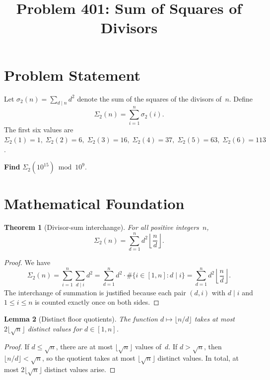 \documentclass[11pt]{article}
\title{Problem 401: Sum of Squares of Divisors}
\author{}
\date{}
\newtheorem{theorem}{Theorem}
\newtheorem{lemma}[theorem]{Lemma}
\begin{document}
\maketitle

\section{Problem Statement}

Let $\sigma_2(n) = \sum_{d \mid n} d^2$ denote the sum of the squares of the divisors of~$n$. Define
\[
  \Sigma_2(n) = \sum_{i=1}^{n} \sigma_2(i).
\]
The first six values are $\Sigma_2(1) = 1,\; \Sigma_2(2) = 6,\; \Sigma_2(3) = 16,\; \Sigma_2(4) = 37,\; \Sigma_2(5) = 63,\; \Sigma_2(6) = 113$.

\medskip\noindent
\textbf{Find} $\Sigma_2(10^{15}) \bmod 10^9$.

\section{Mathematical Foundation}

\begin{theorem}[Divisor-sum interchange]
For all positive integers~$n$,
\[
  \Sigma_2(n) = \sum_{d=1}^{n} d^2 \left\lfloor \frac{n}{d} \right\rfloor.
\]
\end{theorem}

\begin{proof}
We have
\[
  \Sigma_2(n) = \sum_{i=1}^{n}\sum_{d \mid i} d^2
             = \sum_{d=1}^{n} d^2 \cdot \#\{i \in [1,n] : d \mid i\}
             = \sum_{d=1}^{n} d^2 \left\lfloor \frac{n}{d}\right\rfloor.
\]
The interchange of summation is justified because each pair $(d,i)$ with $d \mid i$ and $1 \le i \le n$ is counted exactly once on both sides.
\end{proof}

\begin{lemma}[Distinct floor quotients]
The function $d \mapsto \lfloor n/d \rfloor$ takes at most $2\lfloor\sqrt{n}\rfloor$ distinct values for $d \in [1,n]$.
\end{lemma}

\begin{proof}
If $d \le \sqrt{n}$, there are at most $\lfloor\sqrt{n}\rfloor$ values of~$d$.  If $d > \sqrt{n}$, then $\lfloor n/d \rfloor < \sqrt{n}$, so the quotient takes at most $\lfloor\sqrt{n}\rfloor$ distinct values.  In total, at most $2\lfloor\sqrt{n}\rfloor$ distinct values arise.
\end{proof}
\end{document}
